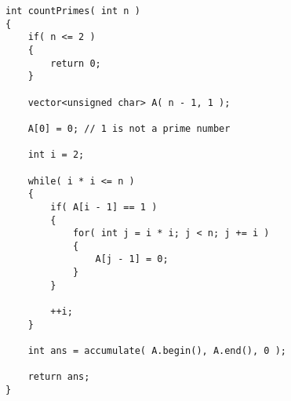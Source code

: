 \setcounter{lstlisting}{0}
\begin{lstlisting}[style=customc, caption={Sieve of Eratosthenes}]
int countPrimes( int n )
{
    if( n <= 2 )
    {
        return 0;
    }

    vector<unsigned char> A( n - 1, 1 );

    A[0] = 0; // 1 is not a prime number

    int i = 2;

    while( i * i <= n )
    {
        if( A[i - 1] == 1 )
        {
            for( int j = i * i; j < n; j += i )
            {
                A[j - 1] = 0;
            }
        }

        ++i;
    }

    int ans = accumulate( A.begin(), A.end(), 0 );

    return ans;
}
\end{lstlisting}